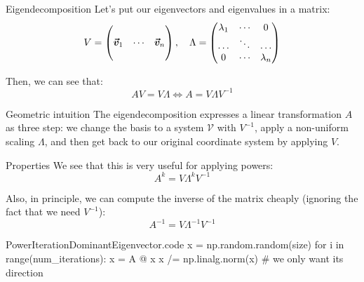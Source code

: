 \documentclass[a4paper]{article}
\begin{document}
\begin{parag}{Eigendecomposition}
    Let's put our eigenvectors and eigenvalues in a matrix:
    \[V = \begin{pmatrix}  &  &  \\ \bm{\protect\vec{v}}_1 & \cdots & \bm{\protect\vec{v}}_n \\  &  &  \end{pmatrix}, \quad \Lambda = \begin{pmatrix} \lambda_1 & \cdots & 0 \\ \hdots & \ddots & \hdots \\ 0 & \cdots & \lambda_n \end{pmatrix} \]

    Then, we can see that: 
    \[A V = V \Lambda \iff A = V \Lambda V^{-1}\]

    \begin{subparag}{Geometric intuition}
        The eigendecomposition expresses a linear transformation $A$ as three step: we change the basis to a system $\mathcal{V}$ with $V^{-1}$, apply a non-uniform scaling $\Lambda$, and then get back to our original coordinate system by applying $V$.
    \end{subparag}

    \begin{subparag}{Properties}
        We see that this is very useful for applying powers: 
        \[A^k = V \Lambda^k V^{-1}\]
        
        Also, in principle, we can compute the inverse of the matrix cheaply (ignoring the fact that we need $V^{-1}$): 
        \[A^{-1} = V\Lambda^{-1} V^{-1}\]
    \end{subparag}
\end{parag}


\begin{filecontents*}[overwrite]{PowerIterationDominantEigenvector.code}
x = np.random.random(size)
for i in range(num_iterations):
    x = A @ x
    x /= np.linalg.norm(x)  # we only want its direction
\end{filecontents*}
\end{document}
